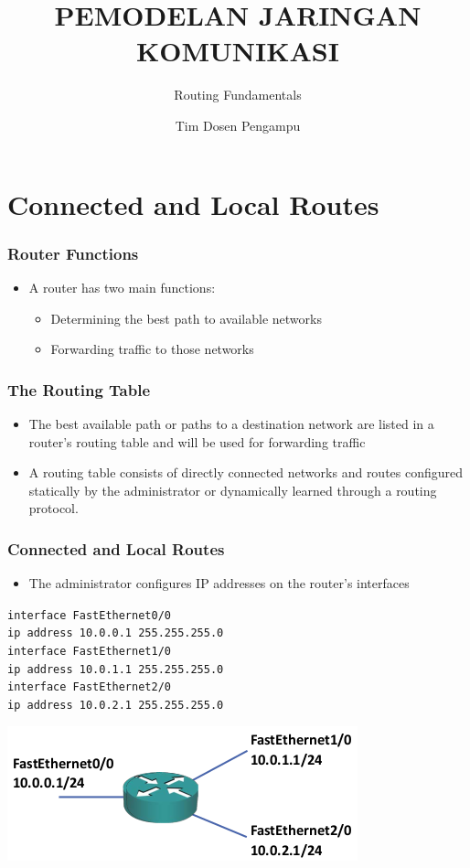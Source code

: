 \documentclass[pdflatex,compress,mathserif]{beamer}
\title{PEMODELAN JARINGAN KOMUNIKASI}
\subtitle{Routing Fundamentals}
\author{Tim Dosen Pengampu}
\begin{document}
\maketitle

\section{Connected and Local Routes}

\begin{frame}
	\frametitle{Router Functions}
	\begin{itemize}
		\item A router has two main functions:
		\begin{itemize}
			\item Determining the best path to available networks
			\item Forwarding traffic to those networks
		\end{itemize}
	\end{itemize}
\end{frame}

\begin{frame}
	\frametitle{The Routing Table}
	\begin{itemize}
		\item The best available path or paths to a destination network are listed in a router’s routing table and will be used for forwarding traffic
		\item A routing table consists of directly connected networks and routes configured statically by the administrator or dynamically learned through a routing protocol.
	\end{itemize}
\end{frame}

\begin{frame}
	\frametitle{Connected and Local Routes}
	\begin{itemize}
		\item The administrator configures IP addresses on the router's interfaces
	\end{itemize}
	\texttt{interface FastEthernet0/0 \\
		ip address 10.0.0.1 255.255.255.0 \\
		interface FastEthernet1/0 \\
		ip address 10.0.1.1 255.255.255.0 \\
		interface FastEthernet2/0 \\
		ip address 10.0.2.1 255.255.255.0} 
	\begin{center}
		\includegraphics[width=0.5\linewidth]{img/img01}
	\end{center}
\end{frame}
\end{document}
